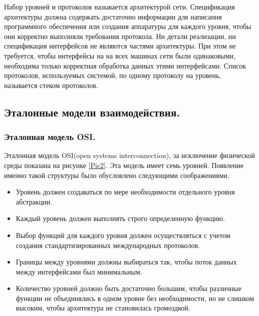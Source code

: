 \documentclass[12pt]{report}
\begin{document}
    Набор уровней и протоколов называется архитектурой сети. Спецификация архитектуры должна содержать достаточно информации для написания программного обеспечения или создания аппаратуры для каждого уровня, чтобы они корректно выполняли требования протокола. Ни детали реализации, ни спецификация интерфейсов не являются частями архитектуры. При этом не требуется, чтобы интерфейсы на на всех машинах сети были одинаковыми, необходима только корректная обработка данных этими интерфейсами. Список протоколов, используемых системой, по одному протоколу на уровень, называется стеком протоколов.

    \subsection{Эталонные модели взаимодействия.}

    \subsubsection{Эталонная модель OSI.}

    Эталонная модель OSI(open systems interconnection), за исключение физической среды показана на рисунке \ref{Pic2}. Эта модель имеет семь уровней. Появление именно такой структуры было обусловлено следующими соображениями.
    \begin{itemize}
        \item Уровень должен создаваться по мере необходимости отдельного уровня абстракции.
        \item Каждый уровень должен выполнять строго определенную функцию.
        \item Выбор функций для каждого уровня должен осуществляться с учетом создания стандартизированных международных протоколов.
        \item Границы между уровнями должны выбираться так, чтобы поток данных между интерфейсами был минимальным.
        \item Количество уровней должно быть достаточно большим, чтобы различные функции не объединялись в одном уровне без необходимости, но не слишком высоким, чтобы архитектура не становилась громоздкой.
    \end{itemize}
\end{document}
